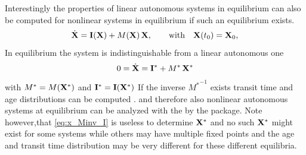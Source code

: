 Interestingly the properties of linear autonomous systems in equilibrium can
also be computed for nonlinear systems in equilibrium if such an equilibrium
exists.
\begin{equation} \label{eq:NLS}
\dot{\mathbf{X}} = \mathbf{I}(\mathbf{X}) + M(\mathbf{X}) \, \mathbf{X}, \qquad  \mathrm{with} \quad \mathbf{X}(t_0) = \mathbf{X}_0,
\end{equation}
In equilibrium the system is indistinguishable from a linear autonomous one
\begin{align} 
  0= \dot{\mathbf{X}} = \mathbf{I}^* + M^* \, \mathbf{X}^*
\end{align}
with $M^*=M(\mathbf{X}^*)$ and $\mathbf{I}^*=\mathbf{I}(\mathbf{X}^*)$ 
If the inverse ${M^*}^{-1}$ exists transit time and age distributions can be computed 
\cite{Metzler2018MGS}.
and therefore also  nonlinear autonomous
systems at equilibrium can be analyzed with the by the
\LAPM{} package.
Note however,that 
\eqref{eq:x_Minv_I} is useless to determine $\mathbf{X}^*$ and 
no such $\mathbf{X}^*$ might exist for some systems
while others may have multiple fixed points and the age and
transit time distribution may be very different for these different equilibria.

